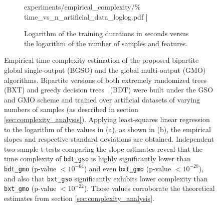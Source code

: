 \begin{figure}[h]
\begin{subfigure}{0.49\textwidth}
{            experiments/empirical\_complexity/\%
            time\_vs\_n\_artificial\_data\_loglog.pdf
        ]}
        \caption{Logarithm of the training durations in seconds versus the logarithm of the number of samples and features.}
    \end{subfigure}
    \caption{
        Empirical time complexity estimation of the proposed bipartite global single-output (BGSO) and the global multi-output (GMO)~\cite{pliakos2018}
        algorithms. Bipartite versions of both extremely randomized trees~\cite{geurts2006extremely} (BXT) and greedy decision trees~\cite{breiman1984} (BDT) were built under the GSO and GMO scheme and trained over artificial datasets of varying numbers of samples (as described in section \ref{sec:complexity_analysis}). Applying least-squares linear regression to the logarithm of the values in (a), as shown in (b), the empirical slopes and respective standard deviations are obtained.
        Independent two-sample t-tests comparing the slope estimates reveal that the time complexity of \texttt{bdt\_gso} is highly significantly lower than \texttt{bdt\_gmo} (p-value $< 10^{-64}$) and even \texttt{bxt\_gmo} (p-value $< 10^{-20}$), and also that \texttt{bxt\_gso} significantly exhibits lower complexity than \texttt{bxt\_gmo} (p-value $< 10^{-22}$). Those values
        corroborate the theoretical estimates from section \ref{sec:complexity_analysis}.
    }
    \label{fig:empirical_complexity}
\end{figure}


